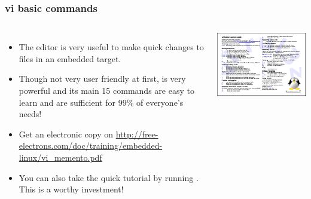 \begin{frame}
  \frametitle{vi basic commands}
  \begin{columns}
    \begin{itemize}
      \item The  editor is very useful to make quick
      changes to files in an embedded target.
      \item Though not very user friendly at first, 
      is very powerful and its main 15 commands are easy to
      learn and are sufficient for 99\% of everyone's needs!
      \item Get an electronic copy on
      \url{http://free-electrons.com/doc/training/embedded-linux/vi_memento.pdf}
      \item You can also take the quick tutorial by running
      . This is a worthy investment!
    \end{itemize}
    \includegraphics[width=\textwidth]{slides/course-information/vi_memento.png}
  \end{columns}
\end{frame}

